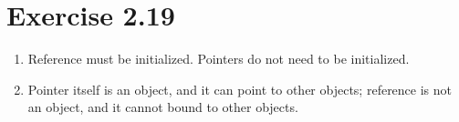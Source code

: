 \documentclass{article}
\begin{document}
\section*{Exercise 2.19}

\begin{enumerate}
    \item Reference must be initialized. Pointers do not need to be initialized.
    \item Pointer itself is an object, and it can point to other objects; reference is not an object, and it cannot bound to other objects.
\end{enumerate}
\end{document}
